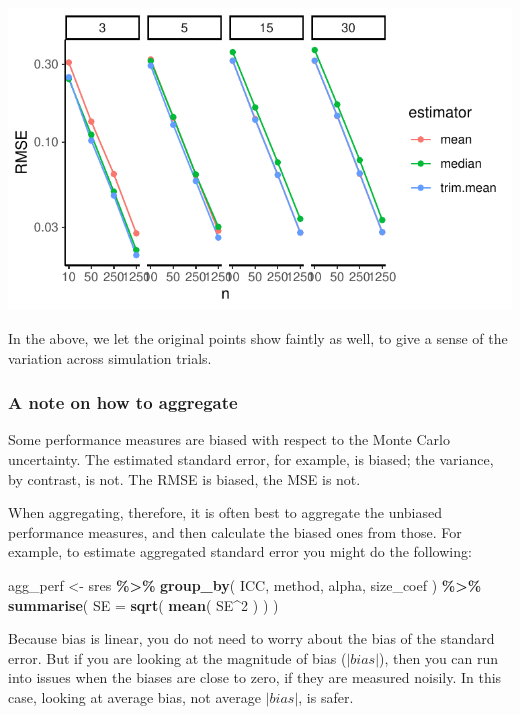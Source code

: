 \documentclass[
]{book}
\newenvironment{Shaded}{\begin{snugshade}}{\end{snugshade}}
\newcommand{\AttributeTok}[1]{\textcolor[rgb]{0.13,0.29,0.53}{#1}}
\newcommand{\DecValTok}[1]{\textcolor[rgb]{0.00,0.00,0.81}{#1}}
\newcommand{\FunctionTok}[1]{\textcolor[rgb]{0.13,0.29,0.53}{\textbf{#1}}}
\newcommand{\NormalTok}[1]{#1}
\newcommand{\OtherTok}[1]{\textcolor[rgb]{0.56,0.35,0.01}{#1}}
\newcommand{\SpecialCharTok}[1]{\textcolor[rgb]{0.81,0.36,0.00}{\textbf{#1}}}
\begin{document}
\begin{center}\includegraphics[width=0.75\linewidth]{Designing-Simulations-in-R_files/figure-latex/unnamed-chunk-175-1} \end{center}

In the above, we let the original points show faintly as well, to give a sense of the variation across simulation trials.

\subsubsection{A note on how to aggregate}\label{a-note-on-how-to-aggregate}

Some performance measures are biased with respect to the Monte Carlo uncertainty.
The estimated standard error, for example, is biased; the variance, by contrast, is not.
The RMSE is biased, the MSE is not.

When aggregating, therefore, it is often best to aggregate the unbiased performance measures, and then calculate the biased ones from those.
For example, to estimate aggregated standard error you might do the following:

\begin{Shaded}
\begin{Highlighting}[]
\NormalTok{agg\_perf }\OtherTok{\textless{}{-}}\NormalTok{ sres }\SpecialCharTok{\%\textgreater{}\%} 
  \FunctionTok{group\_by}\NormalTok{( ICC, method, alpha, size\_coef ) }\SpecialCharTok{\%\textgreater{}\%}
  \FunctionTok{summarise}\NormalTok{( }\AttributeTok{SE =} \FunctionTok{sqrt}\NormalTok{( }\FunctionTok{mean}\NormalTok{( SE}\SpecialCharTok{\^{}}\DecValTok{2}\NormalTok{ ) ) )}
\end{Highlighting}
\end{Shaded}

Because bias is linear, you do not need to worry about the bias of the standard error.
But if you are looking at the magnitude of bias (\(|bias|\)), then you can run into issues when the biases are close to zero, if they are measured noisily.
In this case, looking at average bias, not average \(|bias|\), is safer.
\end{document}
